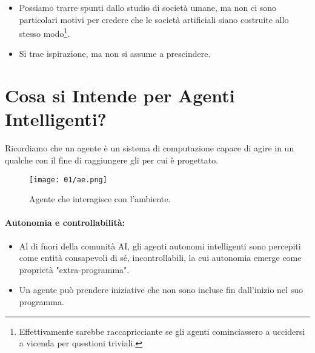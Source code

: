 
\begin{itemize}
  \item Possiamo trarre spunti dallo studio di società umane, ma non ci sono particolari motivi per credere che le società artificiali siano costruite allo stesso modo\footnote{Effettivamente sarebbe raccapricciante se gli agenti cominciassero a uccidersi a vicenda per questioni triviali.}. 
  \item Si trae ispirazione, ma non si assume a prescindere.
\end{itemize}
\pagebreak

\section{Cosa si Intende per Agenti Intelligenti?}

Ricordiamo che un agente è un sistema di computazione capace di agire  in un qualche  con il fine di raggiungere gli  per cui è progettato.


  \begin{figure}[h]
    \centering
    \texttt{[image: 01/ae.png]}
    \caption{Agente che interagisce con l'ambiente.}
    \label{fig:ae}

  \end{figure}



\paragraph{Autonomia e controllabilità:}

\begin{itemize}
  \item Al di fuori della comunità AI, gli agenti autonomi intelligenti sono percepiti come entità consapevoli di sé, incontrollabili, la cui autonomia emerge come proprietà "extra-programma". 
  \item Un agente può prendere iniziative che non sono incluse fin dall'inizio nel suo programma.
\end{itemize}
\pagebreak
